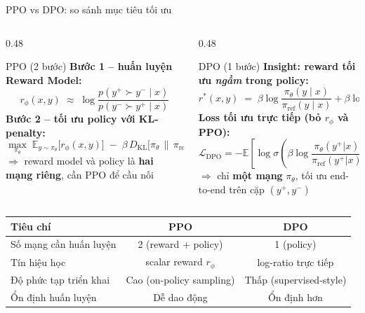 \begin{frame}[t]{PPO vs DPO: so sánh mục tiêu tối ưu}
  \begin{columns}[T,onlytextwidth]
    \begin{column}{0.48\textwidth}
      \begin{block}{PPO (2 bước)}
        \scriptsize
        \textbf{Bước 1 -- huấn luyện Reward Model:}
        \[
          r_\phi(x,y) \;\approx\;
          \log\frac{p(y^+\succ y^-\mid x)}{p(y^-\succ y^+\mid x)}
        \]
        \textbf{Bước 2 -- tối ưu policy với KL-penalty:}
        \[
          \max_{\pi_\theta}\;
          \mathbb{E}_{y\sim\pi_\theta}\!\bigl[r_\phi(x,y)\bigr]
          \;-\;
          \beta\,D_{\mathrm{KL}}\!\bigl[\pi_\theta \,\|\, \pi_{\mathrm{ref}}\bigr]
        \]
        \vspace{1pt}
        \textcolor{red!70!black}{$\Rightarrow$ reward model và policy là \textbf{hai mạng riêng}, cần PPO để cầu nối}
      \end{block}
    \end{column}

    \begin{column}{0.48\textwidth}
      \begin{block}{DPO (1 bước)}
        \scriptsize
        \textbf{Insight: reward tối ưu \textit{ngầm} trong policy:}
        \[
          r^*(x,y) \;=\;
          \beta\log\frac{\pi_\theta(y\mid x)}{\pi_{\mathrm{ref}}(y\mid x)}
          + \beta\log Z(x)
        \]
        \textbf{Loss tối ưu trực tiếp (bỏ $r_\phi$ và PPO):}
        \[
          \mathcal{L}_{\mathrm{DPO}} = -\mathbb{E}\!\left[
            \log\sigma\!\left(
              \beta\log\frac{\pi_\theta(y^+|x)}{\pi_{\mathrm{ref}}(y^+|x)}
              -
              \beta\log\frac{\pi_\theta(y^-|x)}{\pi_{\mathrm{ref}}(y^-|x)}
            \right)
          \right]
        \]
        \textcolor{green!50!black}{$\Rightarrow$ chỉ \textbf{một mạng} $\pi_\theta$, tối ưu end-to-end trên cặp $(y^+,y^-)$}
      \end{block}
    \end{column}
  \end{columns}

  \vspace{2pt}
  \begin{block}{}
    \centering\tiny
    \begin{tabular}{lcc}
      \textbf{Tiêu chí} & \textbf{PPO} & \textbf{DPO} \\
      \hline
      Số mạng cần huấn luyện & 2 (reward + policy) & 1 (policy) \\
      Tín hiệu học               & scalar reward $r_\phi$ & log-ratio trực tiếp \\
      Độ phức tạp triển khai     & Cao (on-policy sampling) & Thấp (supervised-style) \\
      Ổn định huấn luyện         & Dễ dao động              & Ổn định hơn \\
    \end{tabular}
  \end{block}
\end{frame}
